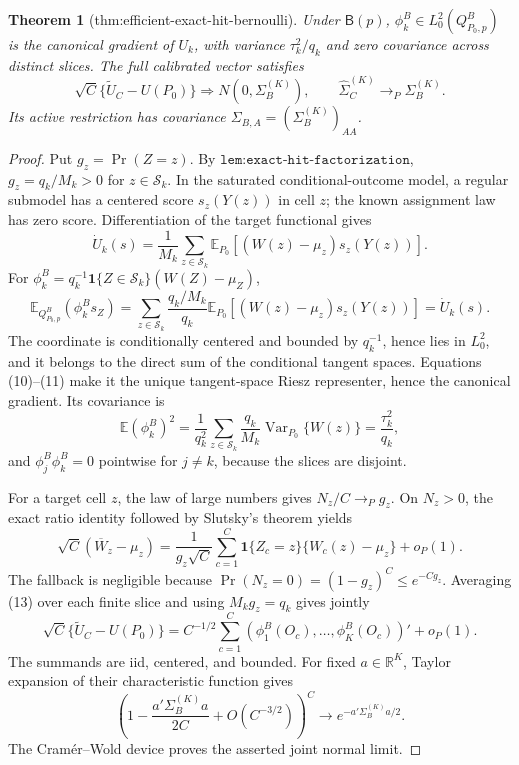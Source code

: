 \documentclass{article}
\newtheorem{theorem}{Theorem}
\begin{document}
\begin{theorem}[thm:efficient-exact-hit-bernoulli]\label{thm:efficient-exact-hit-bernoulli}
Under \(\mathsf B(p)\), \(\phi_k^B\in L^2_0(Q^B_{P_0,p})\) is the canonical gradient of \(U_k\), with variance \(\tau_k^2/q_k\) and zero covariance across distinct slices. The full calibrated vector satisfies \[\sqrt C\{\widetilde U_C-U(P_0)\}\Rightarrow N(0,\Sigma_B^{(K)}),\qquad \widehat\Sigma_C^{(K)}\to_P\Sigma_B^{(K)}.\] Its active restriction has covariance \(\Sigma_{B,A}=(\Sigma_B^{(K)})_{AA}\).
\end{theorem}
\begin{proof}
Put \(g_z=\Pr(Z=z)\).  By \(\texttt{lem:exact-hit-factorization}\), \(g_z=q_k/M_k>0\) for \(z\in\mathcal S_k\).  In the saturated conditional-outcome model, a regular submodel has a centered score \(s_z(Y(z))\) in cell \(z\); the known assignment law has zero score.  Differentiation of the target functional gives
\[
 \dot U_k(s)=\frac1{M_k}\sum_{z\in\mathcal S_k}
 \mathbb E_{P_0}\!\left[(W(z)-\mu_z)s_z(Y(z))\right]. \tag{10}
\]
For \(\phi_k^B=q_k^{-1}\mathbf1\{Z\in\mathcal S_k\}(W(Z)-\mu_Z)\),
\[
 \mathbb E_{Q^B_{P_0,p}}(\phi_k^Bs_Z)
 =\sum_{z\in\mathcal S_k}\frac{q_k/M_k}{q_k}
 \mathbb E_{P_0}\!\left[(W(z)-\mu_z)s_z(Y(z))\right]
 =\dot U_k(s). \tag{11}
\]
The coordinate is conditionally centered and bounded by \(q_k^{-1}\), hence lies in \(L_0^2\), and it belongs to the direct sum of the conditional tangent spaces.  Equations (10)--(11) make it the unique tangent-space Riesz representer, hence the canonical gradient.  Its covariance is
\[
 \mathbb E(\phi_k^B)^2
 =\frac1{q_k^2}\sum_{z\in\mathcal S_k}\frac{q_k}{M_k}
 \operatorname{Var}_{P_0}\{W(z)\}=\frac{\tau_k^2}{q_k}, \tag{12}
\]
and \(\phi_j^B\phi_k^B=0\) pointwise for \(j\ne k\), because the slices are disjoint.

For a target cell \(z\), the law of large numbers gives \(N_z/C\to_Pg_z\).  On \(N_z>0\), the exact ratio identity followed by Slutsky's theorem yields
\[
 \sqrt C(\overline W_z-\mu_z)
 =\frac1{g_z\sqrt C}\sum_{c=1}^C\mathbf1\{Z_c=z\}
   \{W_c(z)-\mu_z\}+o_P(1). \tag{13}
\]
The fallback is negligible because \(\Pr(N_z=0)=(1-g_z)^C\leq e^{-Cg_z}\).  Averaging (13) over each finite slice and using \(M_kg_z=q_k\) gives jointly
\[
 \sqrt C\{\widetilde U_C-U(P_0)\}
 =C^{-1/2}\sum_{c=1}^C(\phi_1^B(O_c),\ldots,\phi_K^B(O_c))'+o_P(1). \tag{14}
\]
The summands are iid, centered, and bounded.  For fixed \(a\in\mathbb R^K\), Taylor expansion of their characteristic function gives
\[
 \left(1-\frac{a'\Sigma_B^{(K)}a}{2C}+O(C^{-3/2})\right)^C
 \longrightarrow e^{-a'\Sigma_B^{(K)}a/2}. \tag{15}
\]
The Cram\'er--Wold device proves the asserted joint normal limit.


\end{proof}
\end{document}
